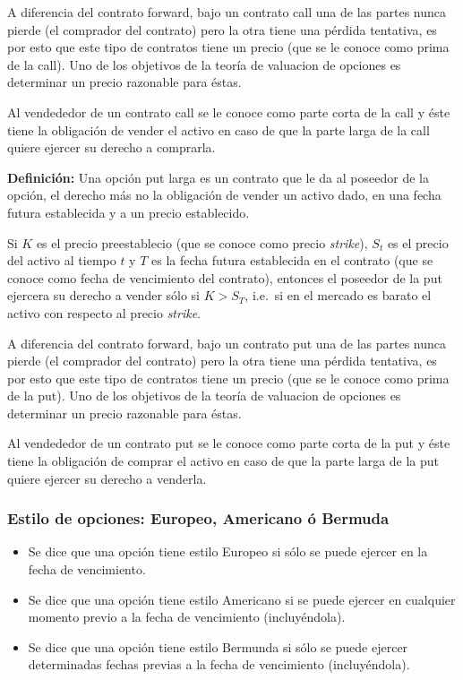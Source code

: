 \documentclass[12pt,reqno,letter]{article}
\begin{document}
	A diferencia del contrato forward, bajo un contrato call una de las
	partes nunca pierde (el comprador del contrato) pero la otra tiene una
	pérdida tentativa, es por esto que este tipo de contratos tiene un
	precio (que se le conoce como prima de la call). Uno de los objetivos de
	la teoría de valuacion de opciones es determinar un precio razonable
	para éstas.
	
	Al vendededor de un contrato call se le conoce como parte corta de la
	call y éste tiene la obligación de vender el activo en caso de que la
	parte larga de la call quiere ejercer su derecho a comprarla.
	
	\textbf{Definición:} Una opción put larga es un contrato que le da al
	poseedor de la opción, el derecho más no la obligación de vender un
	activo dado, en una fecha futura establecida y a un precio establecido.
	
	Si \(K\) es el precio preestablecio (que se conoce como precio
	\emph{strike}), \(S_t\) es el precio del activo al tiempo \(t\) y \(T\)
	es la fecha futura establecida en el contrato (que se conoce como fecha
	de vencimiento del contrato), entonces el poseedor de la put ejercera su
	derecho a vender sólo si \(K > S_T\), i.e.~si en el mercado es barato el
	activo con respecto al precio \emph{strike}.
	
	A diferencia del contrato forward, bajo un contrato put una de las
	partes nunca pierde (el comprador del contrato) pero la otra tiene una
	pérdida tentativa, es por esto que este tipo de contratos tiene un
	precio (que se le conoce como prima de la put). Uno de los objetivos de
	la teoría de valuacion de opciones es determinar un precio razonable
	para éstas.
	
	Al vendededor de un contrato put se le conoce como parte corta de la put
	y éste tiene la obligación de comprar el activo en caso de que la parte
	larga de la put quiere ejercer su derecho a venderla.
	
	\subsubsection{Estilo de opciones: Europeo, Americano ó
		Bermuda}\label{estilo-de-opciones-europeo-americano-o-bermuda}
	
	\begin{itemize}
		\item
		Se dice que una opción tiene estilo Europeo si sólo se puede ejercer
		en la fecha de vencimiento.
		\item
		Se dice que una opción tiene estilo Americano si se puede ejercer en
		cualquier momento previo a la fecha de vencimiento (incluyéndola).
		\item
		Se dice que una opción tiene estilo Bermunda si sólo se puede ejercer
		determinadas fechas previas a la fecha de vencimiento (incluyéndola).
	\end{itemize}
\end{document}
